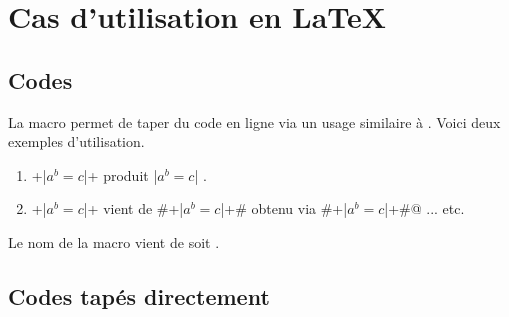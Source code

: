 

\usepackage[lang = french]{../main/main}
\usepackage{../macroenv/macroenv}
\usepackage{../inenglish/inenglish}
\usepackage{../showcase/showcase}
\usepackage{../rem-exa/rem-exa}

\usepackage{listing}







\section{Cas d'utilisation en \LaTeX}

\subsection{Codes }

La macro  permet de taper du code en ligne via un usage similaire à .
Voici deux exemples d'utilisation.

\begin{enumerate}
    \item \bdocinlatex+\bdocinlatex|$a^b = c$|+ produit \bdocinlatex|$a^b = c$| .

    \item \bdocinlatex+\bdocinlatex|$a^b = c$|+ vient de \bdocinlatex#\bdocinlatex+\bdocinlatex|$a^b = c$|+# obtenu via \bdocinlatex@\bdocinlatex#\bdocinlatex+\bdocinlatex|$a^b = c$|+#@ ... etc.
\end{enumerate}


\begin{bdocrem}
    Le nom de la macro  vient de  soit .
\end{bdocrem}




\subsection{Codes tapés directement}


